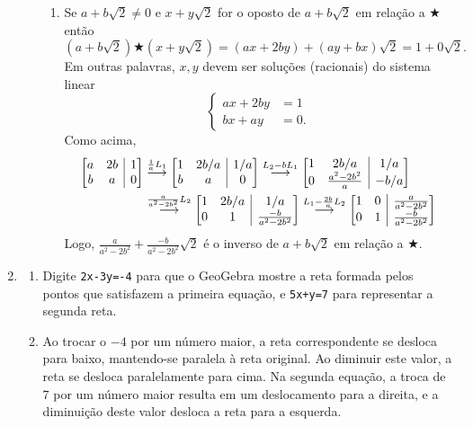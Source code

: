 \documentclass[12pt,a4paper]{article}
\makeatletter
\newenvironment{amatrix}[1]{%
  \left[\begin{array}{@{}*{#1}{c}|c@{}}
}{%
  \end{array}\right]
}
\newcommand{\grstep}[2][\relax]{%
   \ensuremath{\mathrel{
       {\mathop{\longrightarrow}\limits^{#2\mathstrut}_{
                                     \begin{subarray}{l} #1 \end{subarray}}}}}}
\makeatother
\begin{document}
\begin{enumerate}
\begin{enumerate}
\begin{enumerate}
\item Se $a+b\sqrt{2} \neq 0$ e $x+y\sqrt{2}$ for o oposto de $a+b\sqrt{2}$ em relação a $\bigstar$ então
\[
  (a+b\sqrt{2}) \bigstar (x+y\sqrt{2})
= (ax+2by) + (ay+bx)\sqrt{2}
= 1 + 0\sqrt{2}.
\]
Em outras palavras, $x,y$ devem ser soluções (racionais) do sistema linear
\[
\begin{cases}
ax + 2by & = 1 \\
bx +  ay & = 0.
\end{cases}
\]
Como acima,
\begin{align*}
\begin{amatrix}{2} a & 2b & 1 \\
b & a & 0
\end{amatrix}
&
\grstep{ \frac{1}{a} L_1 }
\begin{amatrix}{2}
1 & 2b/a & 1/a \\
b & a & 0
\end{amatrix}
\grstep{ L_2 - b L_1 }
\begin{amatrix}{2}
1 & 2b/a & 1/a \\
0 & \frac{a^2-2b^2}{a} & -b/a
\end{amatrix} \\
& 
\grstep{ \frac{a}{a^2-2b^2} L_2 }
\begin{amatrix}{2}
1 & 2b/a & 1/a \\
0 & 1& \frac{-b}{a^2 -2b^2 }
\end{amatrix}
\grstep{ L_1 - \frac{2b}{a} L_2 }
\begin{amatrix}{2}
1 & 0 & \frac{a}{a^2 -2b^2 } \\
0 & 1 & \frac{-b}{a^2 -2b^2 }
\end{amatrix}
\end{align*}
Logo, $\frac{a}{a^2 -2b^2 } + \frac{-b}{a^2 -2b^2 } \sqrt{2}$ é o inverso de $a+b\sqrt{2}$ em relação a $\bigstar$.
\end{enumerate}
\end{enumerate}

\item 
\begin{enumerate}
\item Digite \texttt{2x-3y=-4} para que o GeoGebra mostre a reta formada pelos pontos que satisfazem a primeira equação, e \texttt{5x+y=7} para representar a segunda reta.
\item Ao trocar o $-4$ por um número maior, a reta correspondente se desloca para baixo, mantendo-se paralela à reta original. Ao diminuir este valor, a reta se desloca paralelamente para cima. Na segunda equação, a troca de $7$ por um número maior resulta em um deslocamento para a direita, e a diminuição deste valor desloca a reta para a esquerda.


\end{enumerate}
\end{enumerate}
\end{document}
